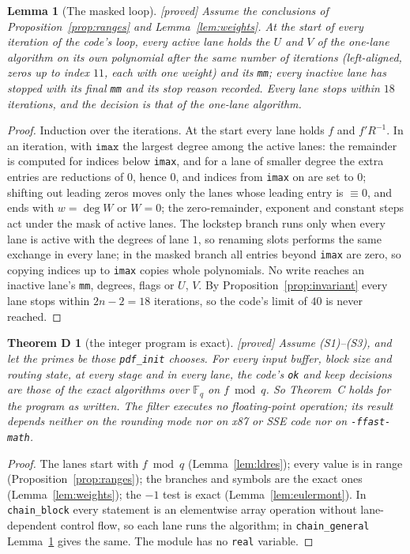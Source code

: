 \documentclass[10pt,a4paper]{article}
\newcommand{\Fq}{\mathbb{F}_q}
\newcommand{\code}[1]{\texttt{#1}}
\newcommand{\stproved}{\textsf{\small[proved]}\xspace}
\theoremstyle{plain}
\newtheorem{lemma}[proposition]{Lemma}
\newtheorem*{thmD}{Theorem D}
\theoremstyle{definition}
\begin{document}
\begin{lemma}[The masked loop]\label{lem:lanes}\stproved
Assume the conclusions of Proposition~\ref{prop:ranges} and Lemma~\ref{lem:weights}.  At the start of every iteration of the code's loop, every active lane holds the $U$
and $V$ of the one-lane algorithm on its own polynomial after the same number of iterations (left-aligned, zeros up to index $11$, each with one weight) and its
\code{mm}; every inactive lane has stopped with its final \code{mm} and its stop reason recorded.  Every lane stops within $18$ iterations, and the decision is that of
the one-lane algorithm.
\end{lemma}
\begin{proof}
Induction over the iterations.  At the start every lane holds $f$ and $f'R^{-1}$.  In an iteration, with $\code{imax}$ the largest degree among the active lanes: the
remainder is computed for indices below \code{imax}, and for a lane of smaller degree the extra entries are reductions of $0$, hence $0$, and indices from \code{imax}
on are set to $0$; shifting out leading zeros moves only the lanes whose leading entry is $\equiv0$, and ends with $w=\deg W$ or $W=0$; the zero-remainder,
exponent and constant steps act under the mask of active lanes.  The lockstep branch runs only when every lane is active with the degrees of lane $1$, so renaming
slots performs the same exchange in every lane; in the masked branch all entries beyond \code{imax} are zero, so copying indices up to \code{imax} copies whole
polynomials.  No write reaches an inactive lane's \code{mm}, degrees, flags or $U$, $V$.  By Proposition~\ref{prop:invariant} every lane stops within
$2n-2=18$ iterations, so the code's limit of $40$ is never reached.
\end{proof}

\begin{thmD}[the integer program is exact]\stproved
Assume (S1)--(S3), and let the primes be those \code{pdf\_init} chooses.  For every input buffer, block size and routing state, at every stage and in every lane, the
code's \code{ok} and keep decisions are those of the exact algorithms over $\Fq$ on $f\bmod q$.  So Theorem~C holds for the program as written.  The filter executes no
floating-point operation; its result depends neither on the rounding mode nor on x87 or SSE code nor on \code{-ffast-math}.
\end{thmD}
\begin{proof}
The lanes start with $f\bmod q$ (Lemma~\ref{lem:ldres}); every value is in range (Proposition~\ref{prop:ranges}); the branches and symbols are the exact ones
(Lemma~\ref{lem:weights}); the $-1$ test is exact (Lemma~\ref{lem:eulermont}).  In \code{chain\_block} every statement is an elementwise array operation without
lane-dependent control flow, so each lane runs the algorithm; in \code{chain\_general} Lemma~\ref{lem:lanes} gives the same.  The module has no \code{real} variable.
\end{proof}
\end{document}
